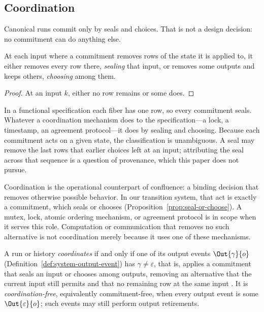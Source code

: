 \subsection{Coordination}
\label{sec:coordination-def}

Canonical runs commit only by seals and choices.  That is not a design
decision: no commitment can do anything else.

\begin{proposition}
\label{prop:seal-or-choose}
At each input where a commitment removes rows of the state it is applied to,
it either removes every row there, \emph{sealing} that input, or removes some
outputs and keeps others, \emph{choosing} among them.
\end{proposition}

\begin{proof}
At an input $k$, either no row remains or some does.
\end{proof}

In a functional specification each fiber has one row, so every commitment
seals.  Whatever a coordination mechanism does to the specification---a lock, a
timestamp, an agreement protocol---it does by sealing and choosing.  Because each
commitment acts on a given state, the classification is unambiguous.  A seal
may remove the last rows that earlier choices left at an input; attributing the
seal across that sequence is a question of provenance, which this paper does
not pursue.

Coordination is the operational counterpart of confluence: a binding decision
that removes otherwise possible behavior.  In our transition system, that
act is exactly a commitment, which seals or chooses
(Proposition~\ref{prop:seal-or-choose}).  A mutex, lock,
atomic ordering mechanism, or agreement protocol is in scope when it serves
this role.  Computation or communication that removes no such alternative is
not coordination merely because it uses one of these mechanisms.

\begin{definition}[Coordination]
\label{def:coordination}
A run or history \emph{coordinates} if and only if one of its output events
$\Out{\gamma}{o}$ (Definition~\ref{def:system-output-event}) has $\gamma\neq\varepsilon$, that is, applies a commitment that seals an input or chooses among outputs,
removing an alternative that the current input still permits and that no
remaining row at the same input \outrel.  It is \emph{coordination-free}, equivalently
commitment-free, when every output event is some $\Out{\varepsilon}{o}$; such
events may still perform output retirements.
\end{definition}

